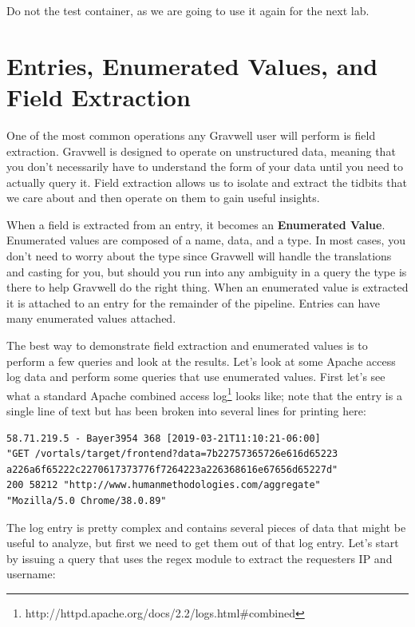 Do not  the test container, as we are
going to use it again for the next lab.

\section{Entries, Enumerated Values, and Field Extraction}
One of the most common operations any Gravwell user will perform is
field extraction. Gravwell is designed to operate on unstructured data,
meaning that you don't necessarily have to understand the form of your data
until you need to actually query it. Field extraction allows us to
isolate and extract the tidbits that we care about and then operate on
them to gain useful insights.

When a field is extracted from an entry, it becomes an \textbf{Enumerated Value}.
Enumerated values are composed of a name, data, and a type. In
most cases, you don't need to worry about the type since Gravwell will
handle the translations and casting for you, but should you run into any
ambiguity in a query the type is there to help Gravwell do the right
thing. When an enumerated value is extracted it is attached to an
entry for the remainder of the pipeline. Entries can have many enumerated values attached.

The best way to demonstrate field extraction and enumerated values is
to perform a few queries and look at the results. Let's look at some
Apache access log data and perform some queries that use enumerated
values. First let's see what a standard Apache combined access
log\footnote{http://httpd.apache.org/docs/2.2/logs.html\#combined} looks like;
note that the entry is a single line of text but has been broken into
several lines for printing here:

\begin{Verbatim}[breaklines=true]
58.71.219.5 - Bayer3954 368 [2019-03-21T11:10:21-06:00] 
"GET /vortals/target/frontend?data=7b22757365726e616d65223
a226a6f65222c2270617373776f7264223a226368616e67656d65227d"
200 58212 "http://www.humanmethodologies.com/aggregate"
"Mozilla/5.0 Chrome/38.0.89"
\end{Verbatim}

The log entry is pretty complex and contains several pieces of data
that might be useful to analyze, but first we need to get them out of
that log entry. Let's start by issuing a query that uses the regex
module to extract the requesters IP and username:


